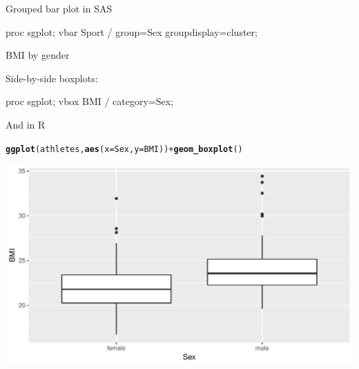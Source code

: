 \documentclass[unknownkeysallowed]{beamer}\usepackage[]{graphicx}\usepackage[]{color}
\makeatletter
\def\maxwidth{ %
  \ifdim\Gin@nat@width>\linewidth
    \linewidth
  \else
    \Gin@nat@width
  \fi
}
\newcommand{\hlopt}[1]{\textcolor[rgb]{0,0,0}{#1}}%
\newcommand{\hlstd}[1]{\textcolor[rgb]{0.345,0.345,0.345}{#1}}%
\newcommand{\hlkwc}[1]{\textcolor[rgb]{0.333,0.667,0.333}{#1}}%
\newcommand{\hlkwd}[1]{\textcolor[rgb]{0.737,0.353,0.396}{\textbf{#1}}}%
\newenvironment{kframe}{%
 \def\at@end@of@kframe{}%
 \ifinner\ifhmode%
  \def\at@end@of@kframe{\end{minipage}}%
  \begin{minipage}{\columnwidth}%
 \fi\fi%
 \def\FrameCommand##1{\hskip\@totalleftmargin \hskip-\fboxsep
 \colorbox{shadecolor}{##1}\hskip-\fboxsep
     \hskip-\linewidth \hskip-\@totalleftmargin \hskip\columnwidth}%
 \MakeFramed {\advance\hsize-\width
   \@totalleftmargin\z@ \linewidth\hsize
   \@setminipage}}%
 {\par\unskip\endMakeFramed%
 \at@end@of@kframe}
\newenvironment{knitrout}{}{} %
\makeatother
\begin{document}
\begin{frame}[fragile]{Grouped bar plot in SAS}
  
  \begin{Sascode}[store=gf]
proc sgplot;
  vbar Sport / group=Sex groupdisplay=cluster;
  \end{Sascode}
  
  
\end{frame}

\begin{frame}[fragile]{BMI by gender}
  
  Side-by-side boxplots:
  
  \begin{Sascode}[store=gg]
proc sgplot;
  vbox BMI / category=Sex;
  \end{Sascode}
  
  
\end{frame}

\begin{frame}[fragile]{And in R}
\begin{knitrout}
\color{fgcolor}\begin{kframe}
\begin{alltt}
\hlkwd{ggplot}\hlstd{(athletes,}\hlkwd{aes}\hlstd{(}\hlkwc{x}\hlstd{=Sex,}\hlkwc{y}\hlstd{=BMI))}\hlopt{+}\hlkwd{geom_boxplot}\hlstd{()}
\end{alltt}
\end{kframe}
\includegraphics[width=\maxwidth]{figure/unnamed-chunk-27-1} 

\end{knitrout}
\end{frame}
\end{document}
